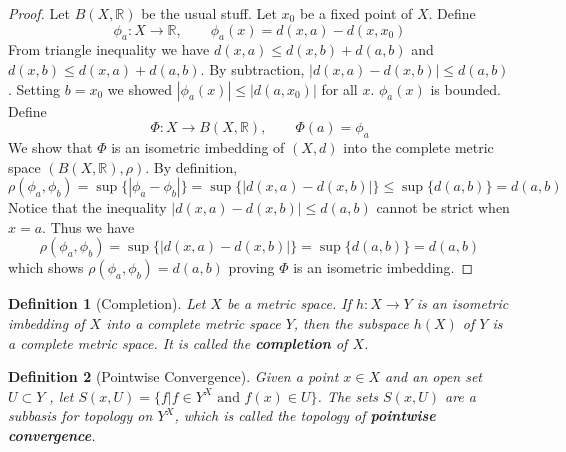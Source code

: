 \documentclass[article,11pt, reqno]{article}
\newtheorem*{definition}{Definition}
\theoremstyle{remark}
\newcommand{\R}{\mathbb{R}}
\newcommand{\ra}{\rightarrow}
\newcommand{\<}{\langle}
\renewcommand{\>}{\rangle}
\begin{document}
\begin{proof}
    Let $B(X,\R)$ be the usual stuff. Let $x_0$ be a fixed point of $X$. Define
    $$
        \phi_a: X\ra \R,\qquad \phi_a(x)=d(x,a)-d(x,x_0)
    $$
    From triangle inequality we have $d(x, a)\leq d(x, b) + d(a, b)$ and $d(x, b)\leq d(x, a) + d(a, b)$. By subtraction, $|d(x,a) - d(x,b)|\leq d(a,b)$. Setting $b=x_0$ we showed $|\phi_a(x)|\leq |d(a,x_0)|$ for all $x$. $\phi_a(x)$ is bounded. Define
    $$
        \Phi: X\ra B(X,\R),\qquad \Phi(a)=\phi_a
    $$
    We show that $\Phi$ is an isometric imbedding of $(X,d)$ into the complete metric space $(B(X,\R),\rho)$. By definition,
    $$
        \rho(\phi_a,\phi_b)=\sup\{|\phi_a-\phi_b|\}=\sup\{|d(x,a)-d(x,b)|\}\leq \sup\{d(a,b)\}=d(a,b)
    $$
    Notice that the inequality $|d(x,a)-d(x,b)|\leq d(a,b)$ cannot be strict when $x=a$. Thus we have 
    $$
        \rho(\phi_a,\phi_b)=\sup\{|d(x,a)-d(x,b)|\}=\sup\{d(a,b)\}=d(a,b)
    $$
    which shows $\rho(\phi_a,\phi_b) = d(a,b)$ proving $\Phi$ is an isometric imbedding.
\end{proof}
\begin{definition}[Completion]
    Let $X$ be a metric space. If $h : X\ra Y$ is an isometric imbedding of $X$ into a complete metric space $Y$, then the subspace $h(X)$ of $Y$ is a complete metric space. It is called the \textbf{completion} of $X$.
\end{definition}
\begin{definition}[Pointwise Convergence]
    Given a point $x\in X$ and an open set $U \subset Y$ , let $S(x,U)=\{f | f \in Y^X\text{ and }f(x)\in U\}$. The sets $S(x,U)$ are a subbasis for topology on $Y^X$, which is called the topology of \textbf{pointwise convergence}.
\end{definition}
\end{document}
